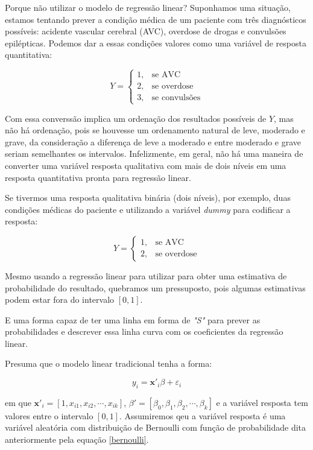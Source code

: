 \documentclass[
	12pt,				%
	openright,			%
	oneside,      %
	a4paper,			%
	english,			%
	french,				%
	spanish,			%
	brazil,				%
	]{abntex2}\usepackage[]{graphicx}\usepackage[]{xcolor}
\begin{document}
Porque não utilizar o modelo de regressão linear? Suponhamos uma situação, estamos 
tentando prever a condição médica de um paciente com três diagnósticos possíveis: 
acidente vascular cerebral (AVC), overdose de drogas e convulsões epilépticas. 
Podemos dar a essas condições valores como uma variável de resposta quantitativa:

$$Y = \left\{
\begin{array}{rcl}
1, & \textrm{se AVC}\\
2, & \textrm{se overdose}\\
3, & \textrm{se convulsões}
\end{array}
\right.$$

Com essa converssão implica um ordenação dos resultados possíveis de $Y$, mas 
não há ordenação, pois se houvesse um ordenamento natural de leve, moderado e 
grave, da consideração a diferença de leve a moderado e entre moderado e grave 
seriam semelhantes os intervalos. Infelizmente, em geral, não há uma maneira de converter
uma variável resposta qualitativa com mais de dois níveis em uma resposta quantitativa 
pronta para regressão linear.

Se tivermos uma resposta qualitativa binária (dois níveis), por exemplo, duas condições
médicas do paciente e utilizando a variável \textit{dummy} para codificar a resposta:

$$
Y = \left\{
\begin{array}{rcl}
1, & \textrm{se AVC}\\
2, & \textrm{se overdose}
\end{array}
\right.
$$

Mesmo usando a regressão linear para utilizar para obter uma estimativa de probabilidade
do resultado, quebramos um pressuposto, pois algumas estimativas podem estar fora do
intervalo $[0,1]$.


E uma forma capaz de ter uma linha em forma de \textit{"S"} para prever as probabilidades 
e descrever essa linha curva com os coeficientes da regressão linear.

Presuma que o modelo linear tradicional tenha a forma: 

\begin{equation}
  y_{i} = \mathbf{x'}_i \beta + \varepsilon_i
\end{equation}

\noindent em que $\mathbf{x'}_i = [1,x_{i1},x_{i2},\cdots,x_{ik}]$, $\beta' = 
[\beta_0,\beta_1,\beta_2,\cdots,\beta_k]$ e a variável resposta tem valores entre
o intervalo $[0,1]$. Assumiremos qeu a variável resposta é uma variável aleatória 
com distribuição de Bernoulli com função de probabilidade dita anteriormente pela 
equação \ref{bernoulli}.
\end{document}
